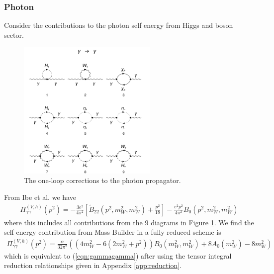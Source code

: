 \documentclass[11pt]{article}
\newcommand{\mb}{\textsf{Mass Builder} }
\begin{document}
\subsubsection{Photon}

Consider the contributions to the photon self energy from Higgs and boson sector. 

\begin{figure}[b!]
\center
\includegraphics[width=0.6\textwidth]{diagrams_V[1]_1.pdf}
\caption{The one-loop corrections to the photon propagator.}\label{fig:gammagamma}
\end{figure}

From Ibe et al. we have
\begin{align}
\Pi_{\gamma \gamma}^{(V, h)}(p^2) =
-\frac{3 e^2}{4\pi^2}
\left[ \tilde{B}_{22}(p^2, m_W^2, m_W^2) + \frac{p^2}{18} \right]
-\frac{e^2 p^2}{4\pi^2} B_0(p^2, m_W^2, m_W^2) \label{eqn:gammagamma}
\end{align}
where this includes all contributions from the 9 diagrams in Figure \ref{fig:gammagamma}.  We find the self energy contribution from \mb in a fully reduced scheme is
\begin{align}
\Pi_{\gamma \gamma}^{(V, h)}(p^2) = \frac{\alpha}{32\pi^2} \left( \left(4m_W^2-6(2m_W^2+p^2)\right)B_0(m_W^2,m_W^2)+8 A_0(m_W^2)-8m_W^2\right)
\end{align}
which is equivalent to (\ref{eqn:gammagamma}) after using the tensor integral reduction relationships given in Appendix \ref{app:reduction}.
\end{document}
